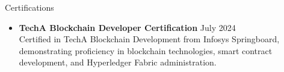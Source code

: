 \documentclass{resume} %
\begin{document}
\begin{rSection}{Certifications} 
        \begin{itemize}


            \item \textbf{TechA Blockchain Developer Certification} \hfill July 2024\\
            Certified in TechA Blockchain Development from Infosys Springboard, demonstrating proficiency in blockchain technologies, smart contract development, and Hyperledger Fabric administration.    
           



   

\end{itemize}
\end{rSection}
\end{document}
